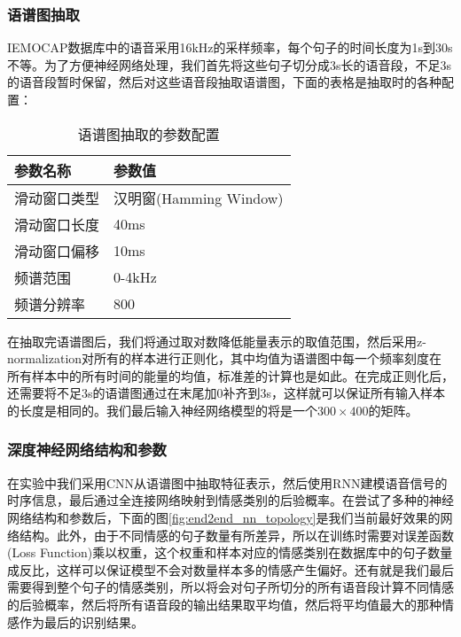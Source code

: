 \subsubsection{语谱图抽取}
\label{ssec:end2end_spectrogram_extract}

IEMOCAP数据库中的语音采用16kHz的采样频率，每个句子的时间长度为1s到30s不等。为了方便神经网络处理，我们首先将这些句子切分成3s长的语音段，不足3s的语音段暂时保留，然后对这些语音段抽取语谱图，下面的表格是抽取时的各种配置：

\begin{table}[htb]
\centering
\begin{minipage}[t]{0.8\linewidth} %
\caption{语谱图抽取的参数配置}
\label{tab:end2end_spectrogram_setup}
    \begin{tabularx}{\linewidth}{X<{\centering} X<{\centering}}
        \toprule[1.5pt]
        参数名称 & 参数值 \\
        \midrule[1pt]
        滑动窗口类型 & 汉明窗(Hamming Window) \\
        滑动窗口长度 & 40ms \\
        滑动窗口偏移 & 10ms \\
        频谱范围 & 0-4kHz \\
        频谱分辨率 & 800 \\
        \bottomrule[1.5pt]
    \end{tabularx}
\end{minipage}
\end{table}

在抽取完语谱图后，我们将通过取对数降低能量表示的取值范围，然后采用z-normalization对所有的样本进行正则化，其中均值为语谱图中每一个频率刻度在所有样本中的所有时间的能量的均值，标准差的计算也是如此。在完成正则化后，还需要将不足3s的语谱图通过在末尾加0补齐到3s，这样就可以保证所有输入样本的长度是相同的。我们最后输入神经网络模型的将是一个$300\times400$的矩阵。

\subsubsection{深度神经网络结构和参数}
\label{ssec:end2end_nn_topology}

在实验中我们采用CNN从语谱图中抽取特征表示，然后使用RNN建模语音信号的时序信息，最后通过全连接网络映射到情感类别的后验概率。在尝试了多种的神经网络结构和参数后，下面的图\ref{fig:end2end_nn_topology}是我们当前最好效果的网络结构。此外，由于不同情感的句子数量有所差异，所以在训练时需要对误差函数(Loss Function)乘以权重，这个权重和样本对应的情感类别在数据库中的句子数量成反比，这样可以保证模型不会对数量样本多的情感产生偏好。还有就是我们最后需要得到整个句子的情感类别，所以将会对句子所切分的所有语音段计算不同情感的后验概率，然后将所有语音段的输出结果取平均值，然后将平均值最大的那种情感作为最后的识别结果。

